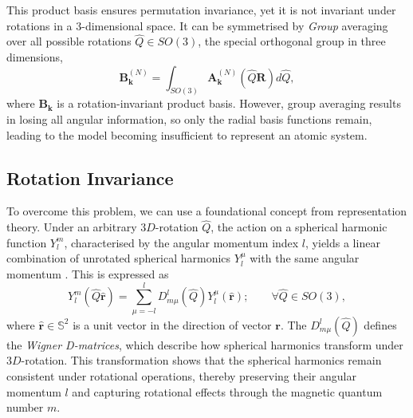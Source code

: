 This product basis ensures permutation invariance, yet it is not invariant under rotations in a $3$-dimensional space.
It can be symmetrised by \textit{Group} averaging over all possible rotations $\hat{Q} \in SO(3)$, the special orthogonal group in three dimensions,
\begin{equation}
\label{equ:2.70}
\textbf{B}^{(N)}_{\mathbf{k}}= \int_{SO(3)} \textbf{A}^{(N)}_{\mathbf{k}}(\hat{Q} \mathbf{R})d\hat{Q},
\end{equation}
where $\textbf{B}_{\mathbf{k}}$ is a rotation-invariant product basis.
However, group averaging results in losing all angular information, so only the radial basis functions remain, leading to the model becoming insufficient to represent an atomic system.
\subsection{Rotation Invariance} \label{sec:2.5.4}
To overcome this problem, we can use a foundational concept from representation theory.
Under an arbitrary $3D$-rotation $\hat{Q}$, the action on a spherical harmonic function $Y_{l}^{m}$, characterised by the angular momentum index $l$, yields a linear combination of unrotated spherical harmonics $Y_{l}^{\mu}$ with the same angular momentum \cite{Bartk2013, Dusson2022}.
This is expressed as
\begin{equation}
\label{equ:2.71}
Y_{l}^{m}(\hat{Q}\hat{\textbf{r}})
= \sum^{l}_{\mu=-l}
D^{l}_{m \mu}(\hat{Q})Y_{l}^{\mu}(\hat{\textbf{r}});
\quad\quad\forall\hat{Q} \in SO(3),
\end{equation}
where $\hat{\textbf{r}}\in \mathbb{S}^2$ is a unit vector in the direction of vector $\mathbf{r}$. 
The $D^{l}_{m\mu}(\hat{Q})$ defines the \textit{Wigner D-matrices}, which describe how spherical harmonics transform under $3D$-rotation.
This transformation shows that the spherical harmonics remain consistent under rotational operations, thereby preserving their angular momentum $l$ and capturing rotational effects through the magnetic quantum number $m$.



